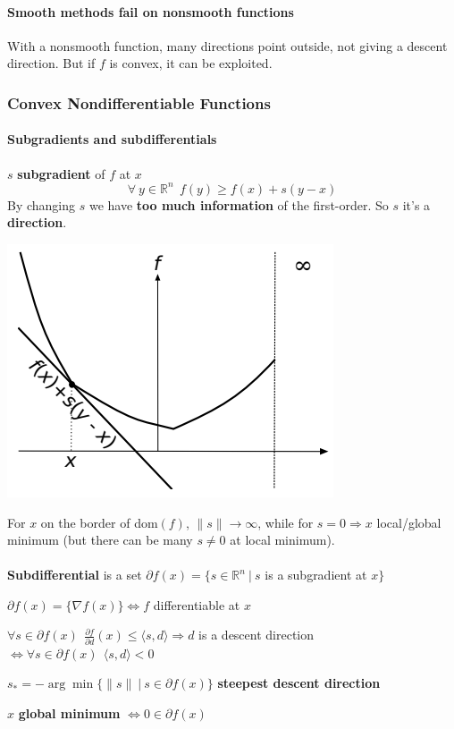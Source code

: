 \documentclass[10pt]{report}
\begin{document}
\paragraph{Smooth methods fail on nonsmooth functions} With a nonsmooth function, many directions point outside, not giving a descent direction. But if $f$ is convex, it can be exploited.
\subsubsection{Convex Nondifferentiable Functions}
\paragraph{Subgradients and subdifferentials} $s$ \textbf{subgradient} of $f$ at $x$ $$\forall\:y\in \mathbb{R}^n\:\:f(y)\geq f(x) + s(y-x)$$ 
By changing $s$ we have \textbf{too much information} of the first-order. So $s$ it's a \textbf{direction}.
\begin{center}
	\includegraphics[scale=0.5]{7.png}
\end{center}
For $x$ on the border of dom$(f)$, $\|s\|\rightarrow\infty$, while for $s=0\Rightarrow x$ local/global minimum (but there can be many $s\neq 0$ at local minimum).\\\\
\textbf{Subdifferential} is a set $\partial f(x) =\{s\in \mathbb{R}^n\:|\:s$ is a subgradient at $x\}$
\begin{list}{}{}
	\item $\partial f(x) = \{\nabla f(x)\}\Leftrightarrow f$ differentiable at $x$
	\item $\forall s \in \partial f(x)\:\:\frac{\partial f}{\partial d}(x) \leq \langle s,d\rangle\Rightarrow d$ is a descent direction $\Leftrightarrow \forall s\in\partial f(x)\:\: \langle s,d\rangle < 0$
	\item $s_* = -\arg\min\{\|s\|\:|\:s\in\partial f(x)\}$ \textbf{steepest descent direction}
	\item $x$ \textbf{global minimum} $\Leftrightarrow 0\in \partial f(x)$
\end{list}
\end{document}
